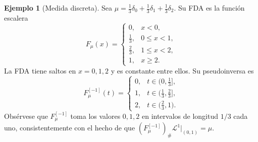 \documentclass[12pt, a4paper]{amsbook}
\theoremstyle{remark}
\theoremstyle{definition}
\newtheorem{ejem}[teo]{Ejemplo}
\numberwithin{section}{chapter}
\numberwithin{subsection}{section}
\numberwithin{equation}{section}
\numberwithin{figure}{chapter}
\begin{document}
\begin{ejem}[Medida discreta]\label{ejem:fda-discreta}
Sea $\mu=\frac{1}{3}\delta_0+\frac{1}{3}\delta_1+\frac{1}{3}\delta_2$.
Su FDA es la función escalera
\[
F_\mu(x)
=
\begin{cases}
0, & x<0,\\
\tfrac{1}{3}, & 0\le x<1,\\
\tfrac{2}{3}, & 1\le x<2,\\
1, & x\ge2.
\end{cases}
\]
La FDA tiene saltos en $x=0,1,2$ y es constante entre ellos.
Su pseudoinversa es
\[
F_\mu^{[-1]}(t)
=
\begin{cases}
0, & t\in\bigl(0,\tfrac{1}{3}\bigr],\\
1, & t\in\bigl(\tfrac{1}{3},\tfrac{2}{3}\bigr],\\
2, & t\in\bigl(\tfrac{2}{3},1\bigr).
\end{cases}
\]
Obsérvese que $F_\mu^{[-1]}$ toma los valores $0,1,2$ en intervalos de longitud
$1/3$ cada uno, consistentemente con el hecho de que
$(F_\mu^{[-1]})_\#\mathcal L^1|_{(0,1)}=\mu$.


\end{ejem}
\end{document}
